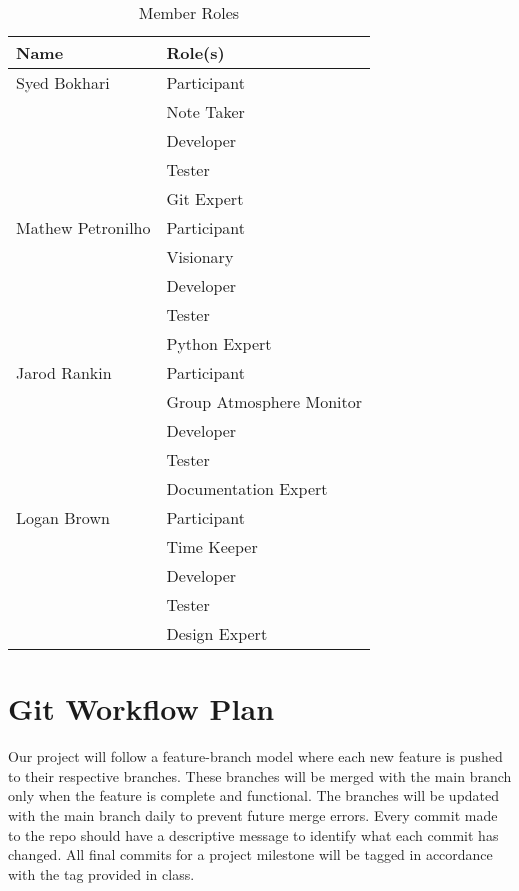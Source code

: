 \documentclass{article}
\begin{document}
\begin{table}[H]
    \centering
    \begin{tabularx}{\textwidth}{|X|X|}
\hline
        \textbf{Name} & \textbf{Role(s)}\\
\hline
        Syed Bokhari                    & Participant\\
                                    & Note Taker\\
                                    & Developer\\
                                    & Tester\\
			    & Git Expert\\
\hline
        Mathew Petronilho                  & Participant\\
                                    & Visionary\\
                                    & Developer\\
                                    & Tester\\
			    & Python Expert\\
\hline
        Jarod Rankin                     & Participant\\
                                    & Group Atmosphere Monitor\\
                                    & Developer\\
                                    & Tester\\
			    & Documentation Expert\\
\hline
       Logan Brown                   & Participant\\
                                    & Time Keeper\\
                                    & Developer\\
                                    & Tester\\
			    & Design Expert\\
\hline
    \end{tabularx}
\caption{Member Roles} \label{tab:memberRoles}

\end{table}


\section{Git Workflow Plan}
Our project will follow a feature-branch model where each new feature is pushed to their respective branches. These branches will be merged with the main branch only when the feature is complete and functional. The branches will be updated with the main branch daily to prevent future merge errors. Every commit made to the repo should have a descriptive message to identify what each commit has changed.
All final commits for a project milestone will be tagged in accordance with the tag provided in class.
\end{document}
